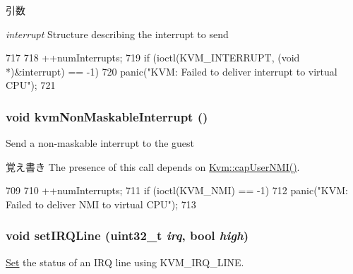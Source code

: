 \begin{DoxyParams}{引数}
\item[{\em interrupt}]Structure describing the interrupt to send \end{DoxyParams}



\begin{DoxyCode}
717 {
718     ++numInterrupts;
719     if (ioctl(KVM_INTERRUPT, (void *)&interrupt) == -1)
720         panic("KVM: Failed to deliver interrupt to virtual CPU\n");
721 }
\end{DoxyCode}
\hypertarget{group__KvmInterrupts_gabc700469cba2d4bba666902e552e7c2e}{
\subsubsection[{kvmNonMaskableInterrupt}]{\setlength{\rightskip}{0pt plus 5cm}void kvmNonMaskableInterrupt ()}}
\label{group__KvmInterrupts_gabc700469cba2d4bba666902e552e7c2e}
Send a non-\/maskable interrupt to the guest

\begin{DoxyNote}{覚え書き}
The presence of this call depends on \hyperlink{classKvm_acf36e247bf7857c1c7b1e260eff7f7db}{Kvm::capUserNMI()}. 
\end{DoxyNote}



\begin{DoxyCode}
709 {
710     ++numInterrupts;
711     if (ioctl(KVM_NMI) == -1)
712         panic("KVM: Failed to deliver NMI to virtual CPU\n");
713 }
\end{DoxyCode}
\hypertarget{group__KvmInterrupts_ga5037b917c47fff611ecdd5b547655284}{
\subsubsection[{setIRQLine}]{\setlength{\rightskip}{0pt plus 5cm}void setIRQLine ({\bf uint32\_\-t} {\em irq}, \/  bool {\em high})}}
\label{group__KvmInterrupts_ga5037b917c47fff611ecdd5b547655284}
\hyperlink{classSet}{Set} the status of an IRQ line using KVM\_\-IRQ\_\-LINE.

